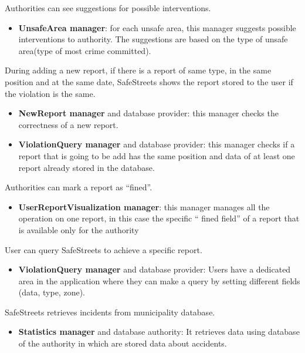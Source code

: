 \documentclass[../RASD.tex]{subfiles}
\begin{document}
\begin{enumerate}
         Authorities can see suggestions for possible interventions.
        \begin{itemize}
            \item \textbf{UnsafeArea manager}: for each unsafe area, this manager suggests possible interventions to authority. The suggestions are based on the type of unsafe area(type of most crime committed).
        \end{itemize}

         During adding a new report, if there is a report of same type, in the same position and at the same date, SafeStreets shows the report stored to the user if the violation is the same.
        \begin{itemize}
            \item \textbf{NewReport manager} and database provider: this manager checks the correctness of a new report.
            \item \textbf{ViolationQuery manager} and database provider: this manager checks if a report that is going to be add has the same position and data of at least one report already stored in the database.
        \end{itemize}

         Authorities can mark a report as “fined”.
        \begin{itemize}
            \item \textbf{UserReportVisualization manager}: this manager manages all the operation on one report, in this case the specific “ fined field” of a report that is available only for the authority
        \end{itemize}

         User can query SafeStreets to achieve a specific report.
        \begin{itemize}
            \item \textbf{ViolationQuery manager} and database provider: Users have a dedicated area in the application where they can make a query by setting different fields (data, type, zone).
        \end{itemize}

         SafeStreets retrieves incidents from municipality database.
        \begin{itemize}
            \item \textbf{Statistics manager} and database authority: It retrieves data using database of the authority in which are stored data about accidents.
        \end{itemize}
    \end{enumerate}
\end{document}
